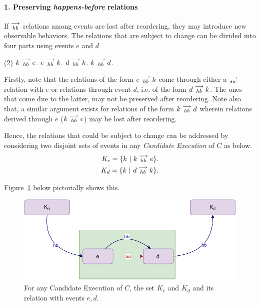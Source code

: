 
\paragraph{1. Preserving \textit{happens-before} relations}
        
        

    If $\stackrel{\longrightarrow}{_{hb}}$ relations among events are lost after reordering, they may introduce new observable behaviors. The relations that are subject to change can be divided into four parts using events $e$ and $d$
    
    \begin{tasks}(2)
        \task $k\stackrel{\longrightarrow}{_{hb}}e$.
        \task $e\stackrel{\longrightarrow}{_{hb}}k$.
        \task $d\stackrel{\longrightarrow}{_{hb}}k$.
        \task $k\stackrel{\longrightarrow}{_{hb}}d$.
    \end{tasks}

    Firstly, note that the relations of the form $e\stackrel{\longrightarrow}{_{hb}}k$ come through either a $\stackrel{\longrightarrow}{_{sw}}$ relation with $e$ or relations through event $d$, i.e. of the form $d\stackrel{\longrightarrow}{_{hb}}k$. The ones that come due to the latter, may not be preserved after reordering. Note also that, a similar argument exists for relations of the form $k\stackrel{\longrightarrow}{_{hb}}d$ wherein relations derived through $e$  ($k\stackrel{\longrightarrow}{_{hb}}e$) may be lost after reordering. 

    Hence, the relations that could be subject to change can be addressed by considering two disjoint sets of events in any \textit{Candidate Execution} of $C$ as below.
    \begin{align*}
       K_e = \{k \ | \ k\stackrel{\longrightarrow}{_{hb}}e \}. \\
       K_d = \{k \ | \ d\stackrel{\longrightarrow}{_{hb}}k \}. 
    \end{align*}

    Figure~\ref{reord:preserve_hb(a)} below pictorially shows this.
    \begin{figure}[H]
        \centering
        \includegraphics[scale=0.7]{5.InstructionReordering/4.ValidReorderingCandidate/ProofParts/Part1/part1(a).pdf}
        \caption{For any Candidate Execution of $C$, the set $K_e$ and $K_d$ and its relation with events $e,d$.}
        \label{reord:preserve_hb(a)}
    \end{figure}
    
